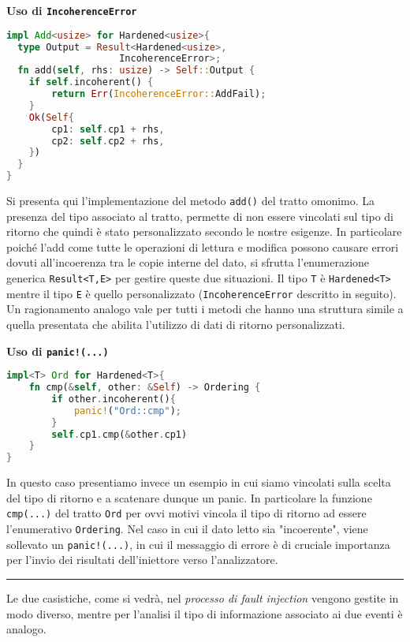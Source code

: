 \begin{multicols}{2}
\noindent
\textbf{Uso di \texttt{IncoherenceError} }
\begin{lstlisting}[language=Rust, style=boxed]
impl Add<usize> for Hardened<usize>{
  type Output = Result<Hardened<usize>, 
                    IncoherenceError>;
  fn add(self, rhs: usize) -> Self::Output {
    if self.incoherent() {
        return Err(IncoherenceError::AddFail);
    }
    Ok(Self{
        cp1: self.cp1 + rhs,
        cp2: self.cp2 + rhs,
    })
  }
}
\end{lstlisting}
Si presenta qui l'implementazione del metodo \texttt{add()} del tratto omonimo. La presenza del tipo associato al tratto, permette di non essere vincolati sul tipo di ritorno che quindi è stato personalizzato secondo le nostre esigenze. In particolare poiché l'add come tutte le operazioni di lettura e modifica possono causare errori dovuti all'incoerenza tra le copie interne del dato, si sfrutta l'enumerazione generica \texttt{Result<T,E>} per gestire queste due situazioni. Il tipo \texttt{T} è \texttt{Hardened<T>} mentre il tipo \texttt{E} è quello personalizzato (\texttt{IncoherenceError} descritto in seguito). Un ragionamento analogo vale per tutti i metodi che hanno una struttura simile a quella presentata che abilita l'utilizzo di dati di ritorno personalizzati. 

\newcolumn
\noindent
\textbf{Uso di \texttt{panic!(...)}}
\begin{lstlisting}[language=Rust, style=boxed]
impl<T> Ord for Hardened<T>{
    fn cmp(&self, other: &Self) -> Ordering {
        if other.incoherent(){
            panic!("Ord::cmp");
        }
        self.cp1.cmp(&other.cp1)
    }
}
\end{lstlisting}
In questo caso presentiamo invece un esempio in cui siamo vincolati  sulla scelta del tipo di ritorno e a scatenare dunque un panic. In particolare la funzione \texttt{cmp(...)} del tratto \texttt{Ord} per ovvi motivi vincola il tipo di ritorno ad essere l'enumerativo \texttt{Ordering}. Nel caso in cui il dato letto sia "incoerente", viene sollevato un \texttt{panic!(...)}, in cui il messaggio di errore è di cruciale importanza per l'invio dei risultati dell'iniettore verso l'analizzatore. \\
\hrule
\vspace{0.5cm}
\noindent
Le due casistiche, come si vedrà, nel \textit{processo di fault injection} vengono gestite in modo diverso, mentre per l'analisi il tipo di informazione associato ai due eventi è analogo.

\end{multicols}

